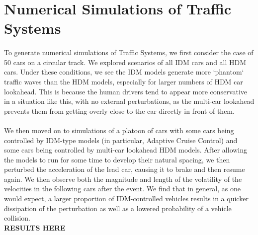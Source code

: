 \documentclass[11pt]{article}
\begin{document}
\section{Numerical Simulations of Traffic Systems}

\paragraph{}To generate numerical simulations of Traffic Systems, we first consider the case of 50 cars on a circular track. We explored scenarios of all IDM cars and all HDM cars. Under these conditions, we see the IDM models generate more `phantom` traffic waves than the HDM models, especially for larger numbers of HDM car lookahead. This is because the human drivers tend to appear more conservative in a situation like this, with no external perturbations, as the multi-car lookahead prevents them from getting overly close to the car directly in front of them.



\paragraph{}We then moved on to simulations of a platoon of cars with some cars being controlled by IDM-type models (in particular, Adaptive Cruise Control) and some cars being controlled by multi-car lookahead HDM models. After allowing the models to run for some time to develop their natural spacing, we then perturbed the acceleration of the lead car, causing it to brake and then resume again. We then observe both the magnitude and length of the volatility of the velocities in the following cars after the event. We find that in general, as one would expect, a larger proportion of IDM-controlled vehicles results in a quicker dissipation of the perturbation as well as a lowered probability of a vehicle collision.\\
\textbf{RESULTS HERE}
\end{document}
